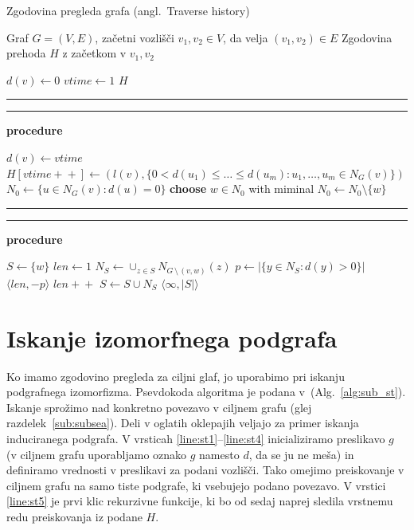 \documentclass[a4paper, 12pt, ]{book}
\newcommand\Subalg[1]{%
	\Statex%
	\vspace*{-.7\baselineskip}%
	\hspace*{\dimexpr-\algorithmicindent-4pt\relax}%
	\rule{\textwidth}{0.4pt}%
	\Statex%
	
	\vspace*{-.7\baselineskip}%
	\Statex\hspace*{\dimexpr-\algorithmicindent-2pt\relax}%
	\rule{\textwidth}{0.4pt}%
	
	\Statex\hspace*{-\algorithmicindent}\textbf{procedure} #1%
}
\newcommand{\refalg}[1]{(Alg.~\ref{#1})}
\begin{document}
\begin{algorithm}
\caption{Zgodovina pregleda grafa (angl.~Traverse history)}
\label{alg:sub_th}
\begin{algorithmic}[1]
	\Require Graf $G = (V, E)$, začetni vozlišči $v_1, v_2 \in V$, da velja $(v_1, v_2) \in E$
	\Ensure Zgodovina prehoda $H$ z začetkom v $v_1, v_2$

				\label{line:th1}
		\State $d(v) \gets 0$
	\EndFor
	\State $vtime \gets 1$
	\State {}		\label{line:th4}
	\State \Return $H$


	\Subalg{}
	\State $d(v) \gets vtime$ 		\label{line:th6}
	\State $H[vtime+\!+] \gets (l(v), \{0 < d(u_1) \leq \ldots \leq d(u_m) : u_1, \ldots, u_m \in N_G(v)\})$ 	\label{line:th7}
								\label{line:th8}
	\EndIf
	\State $N_0 \gets \{ u \in N_G(v): d(u) = 0 \}$		\label{line:th9}
						\label{line:th10}
		\State \textbf{choose} $w \in N_0$ with miminal 		\label{line:th11}
								\label{line:th12}
		\EndIf
		\State $N_0 \gets N_0 \setminus \{w\}$		\label{line:th13}
	\EndWhile


	\Subalg{}
	\State $S \gets \{w\}$						\label{line:th14}
	\State $len \gets 1$							\label{line:th15}
	\Repeat
		\State $N_S \gets \cup_{z \in S}N_{G\, \setminus\,  (v,w)}(z)$	\label{line:th17}
		\State $p \gets | \{ y \in N_S: d(y) > 0 \} |$					\label{line:th18}
												\label{line:th19}
			\Return $\langle len, -p \rangle$
		\EndIf
		\State $len+\!+$						\label{line:th20}
		\State $S \gets S \cup N_S$			\label{line:th21}
					\label{line:th22}
	\State \Return $ \langle \infty, |S| \rangle $	\label{line:th23}
\end{algorithmic}
\end{algorithm}

	\clearpage


	\section{Iskanje izomorfnega podgrafa}
	\label{sub:search}
	Ko imamo zgodovino pregleda za ciljni glaf, jo uporabimo pri iskanju podgrafnega izomorfizma. Psevdokoda algoritma je podana v~\refalg{alg:sub_st}.
	Iskanje sprožimo nad konkretno povezavo v ciljnem grafu (glej razdelek~\ref{sub:subsea}). Deli v oglatih oklepajih veljajo za primer iskanja
	induciranega podgrafa. V vrsticah \ref{line:st1}--\ref{line:st4} inicializiramo preslikavo $g$ (v ciljnem grafu uporabljamo oznako $g$ namesto $d$,
	da se ju ne meša) in definiramo vrednosti v preslikavi za podani vozlišči. Tako omejimo preiskovanje v ciljnem grafu na samo tiste podgrafe, ki 
	vsebujejo podano povezavo. V vrstici \ref{line:st5} je prvi klic rekurzivne funkcije, ki bo od sedaj naprej sledila vrstnemu redu preiskovanja iz podane
	$H$.
	
\end{document}
